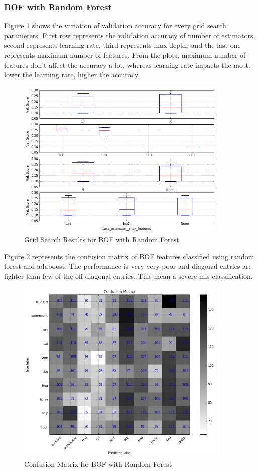 \documentclass[12pt]{article}
\begin{document}
\subsubsection{BOF with Random Forest}
Figure \ref{img:rf_cv_bow} shows the variation of validation accuracy for every grid search parameters. First row represents the validation accuracy of number of estimators, second represents learning rate, third represents max depth, and the last one represents maximum number of features. From the plots, maximum number of features don't affect the accuracy a lot, whereas learning rate impacts the most. lower the learning rate, higher the accuracy.
\begin{figure}[H]
\centering
\includegraphics[width=0.9\textwidth]{images/rf_cv_bow.png} 
\caption{Grid Search Results for BOF with Random Forest}
\label{img:rf_cv_bow}
\end{figure}
Figure \ref{img:rf_cm_bow} represents the confusion matrix of BOF features classified using random forest and adaboost. The performance is very very poor and diagonal entries are lighter than few of the off-diagonal entries. This mean a severe mis-classification. 
\begin{figure}[H]
\centering
\includegraphics[width=0.9\textwidth]{images/rf_cm_bow.png} 
\caption{Confusion Matrix for BOF with Random Forest}
\label{img:rf_cm_bow}
\end{figure}
\end{document}
